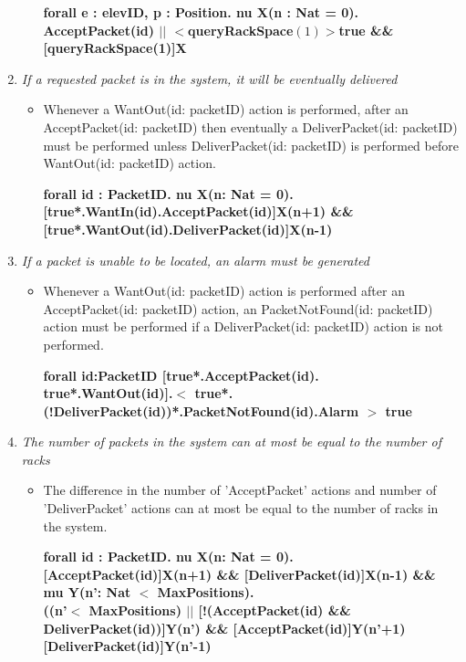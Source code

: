 \begin{enumerate}
\begin{itemize}
	\textbf{forall e : elevID, p : Position. nu X(n : Nat = 0). AcceptPacket(id) $||$ $<$queryRackSpace$(1)>$true \&\& [queryRackSpace(1)]X}
	
	\end{itemize}
	
\item \textit{If a requested packet is in the system, it will be
	eventually delivered}
	\begin{itemize}
	\item Whenever a WantOut(id: packetID) action is performed, after an AcceptPacket(id: 
	packetID) then eventually a DeliverPacket(id: packetID) must be
	performed unless DeliverPacket(id: packetID) is performed before WantOut(id: packetID) action. 
	
	\textbf{forall id : PacketID. nu X(n: Nat = 0).[true*.WantIn(id).AcceptPacket(id)]X(n+1) \&\& [true*.WantOut(id).DeliverPacket(id)]X(n-1)}
	
	\end{itemize}
	
\item \textit{If a packet is unable to be located, an alarm must 
	be generated}
	\begin{itemize}	
	\item  Whenever a WantOut(id: packetID) action is performed after an 
	AcceptPacket(id: packetID) action, an PacketNotFound(id: packetID) action must be performed if a 
	DeliverPacket(id: packetID) action is not performed.
	
	\textbf{forall id:PacketID [true*.AcceptPacket(id). \\ 
	true*.WantOut(id)].$<$ true*. 
	(!DeliverPacket(id))*.PacketNotFound(id).Alarm $>$ true	}
	
	\end{itemize}
		
\item \textit{The number of packets in the system can at most be equal to the number of racks}
	\begin{itemize}
	\item The difference in the number of 'AcceptPacket'
	actions and number of 'DeliverPacket' actions can at most be 
	equal to the number of racks in the system.
	
		\textbf{forall id : PacketID. nu X(n: Nat = 0).[AcceptPacket(id)]X(n+1) \&\& [DeliverPacket(id)]X(n-1) \&\&
mu Y(n': Nat $<$ MaxPositions).\\((n'$<$ MaxPositions) $||$ [!(AcceptPacket(id) \&\& DeliverPacket(id))]Y(n') \&\& [AcceptPacket(id)]Y(n'+1)[DeliverPacket(id)]Y(n'-1)}

	\end{itemize}
\end{enumerate}
